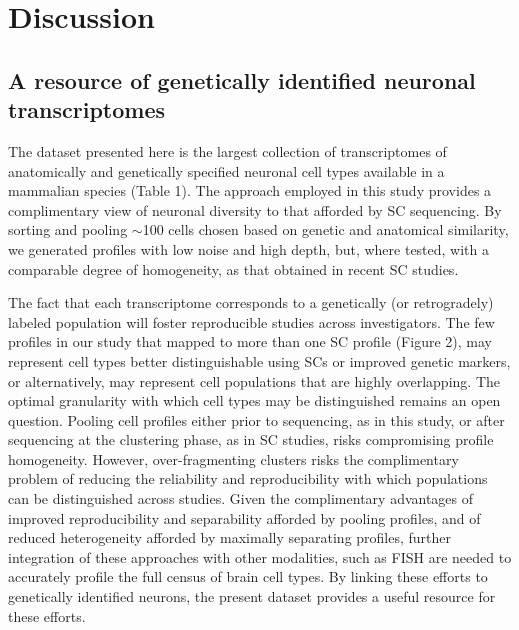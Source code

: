 
\section{Discussion}

\subsection{A resource of genetically identified neuronal transcriptomes}

The dataset presented here is the largest collection of transcriptomes of anatomically and genetically specified neuronal cell types available in a mammalian species (Table 1). The approach employed in this study provides a complimentary view of neuronal diversity to that afforded by SC sequencing. By sorting and pooling $\sim$100 cells chosen based on genetic and anatomical similarity, we generated profiles with low noise and high depth, but, where tested, with a comparable degree of homogeneity, as that obtained in recent SC studies. 

The fact that each transcriptome corresponds to a genetically (or retrogradely) labeled population will foster reproducible studies across investigators. The few profiles in our study that mapped to more than one SC profile (Figure 2), may represent cell types better distinguishable using SCs or improved genetic markers, or alternatively, may represent cell populations that are highly overlapping. The optimal granularity with which cell types may be distinguished remains an open question. Pooling cell profiles either prior to sequencing, as in this study, or after sequencing at the clustering phase, as in SC studies, risks compromising profile homogeneity. However, over-fragmenting clusters risks the complimentary problem of reducing the reliability and reproducibility with which populations can be distinguished across studies. Given the complimentary advantages of improved reproducibility and separability afforded by pooling profiles, and of reduced heterogeneity afforded by maximally separating profiles, further integration of these approaches with other modalities, such as FISH \citep{Moffitt_2016} are needed to accurately profile the full census of brain cell types. By linking these efforts to genetically identified neurons, the present dataset provides a useful resource for these efforts. 

